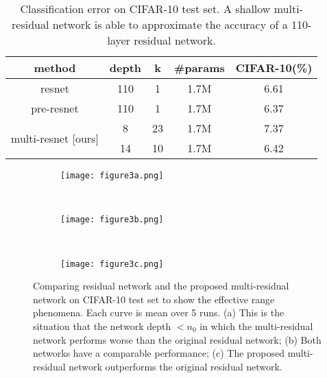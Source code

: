 \documentclass[journal]{IEEEtran}
\begin{document}
\begin{table}[!htb]
\centering
\begin{tabular}{||c c c c c ||} 
\hline
method & depth & k & \#params & CIFAR-10(\%)  \\ 
\hline\hline
\multirow{1}{7.5em}{resnet\cite{he2015deep}} 
& 110 & 1& 1.7M & 6.61 \\ 
\hline
\multirow{1}{7.5em}{pre-resnet\cite{he2016identity}} 
& 110 & 1& 1.7M & 6.37 \\ 
\hline
\multirow{2}{7.5em}{multi-resnet [ours]} 
& 8 & 23 & 1.7M & 7.37\\ 
& 14 & 10 & 1.7M & 6.42 \\ 

\hline
\end{tabular}
\caption{Classification error on CIFAR-10 test set. A shallow multi-residual network is able to approximate the accuracy of a 110-layer residual network.}
\label{table:1}
\end{table}


\begin{figure*}[!t]
    \centering
    \begin{subfigure}[b]{0.4\textwidth}
        \texttt{[image: figure3a.png]}
        \caption{}
        \label{fig:a}
    \end{subfigure}
    ~ %
    \begin{subfigure}[b]{0.4\textwidth}
        \texttt{[image: figure3b.png]}
        \caption{}
        \label{fig:b}
    \end{subfigure}
    ~ %
    \begin{subfigure}[b]{0.4\textwidth}
        \texttt{[image: figure3c.png]}
        \caption{}
        \label{fig:c}
    \end{subfigure}
    \caption{Comparing residual network and the proposed multi-residual network on CIFAR-10 test set to show the effective range phenomena. Each curve is mean over 5 runs. (a) This is the situation that the network depth $<n_0$ in which the multi-residual network performs worse than the original residual network; (b) Both networks have a comparable performance; (c) The proposed multi-residual network outperforms the original residual network.}\label{fig:tradeoff}
\end{figure*}
\end{document}
